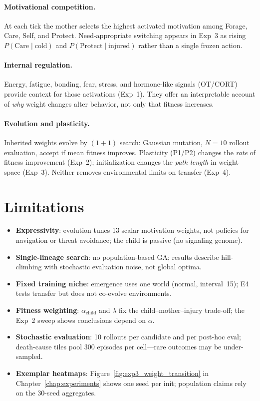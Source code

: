 \paragraph{Motivational competition.}
At each tick the mother selects the highest activated motivation among Forage, Care, Self, and Protect.
Need-appropriate switching appears in Exp~3 as rising $P(\text{Care}\mid\text{cold})$ and $P(\text{Protect}\mid\text{injured})$ rather than a single frozen action.

\paragraph{Internal regulation.}
Energy, fatigue, bonding, fear, stress, and hormone-like signals (OT/CORT) provide context for those activations (Exp~1).
They offer an interpretable account of \emph{why} weight changes alter behavior, not only that fitness increases.

\paragraph{Evolution and plasticity.}
Inherited weights evolve by $(1{+}1)$ search: Gaussian mutation, $N{=}10$ rollout evaluation, accept if mean fitness improves.
Plasticity (P1/P2) changes the \emph{rate} of fitness improvement (Exp~2); initialization changes the \emph{path length} in weight space (Exp~3).
Neither removes environmental limits on transfer (Exp~4).

\section{Limitations}

\begin{itemize}
    \item \textbf{Expressivity}: evolution tunes 13 scalar motivation weights, not policies for navigation or threat avoidance; the child is passive (no signaling genome).
    \item \textbf{Single-lineage search}: no population-based GA; results describe hill-climbing with stochastic evaluation noise, not global optima.
    \item \textbf{Fixed training niche}: emergence uses one world (normal, interval~15); E4 tests transfer but does not co-evolve environments.
    \item \textbf{Fitness weighting}: $\alpha_{\text{child}}$ and $\lambda$ fix the child--mother--injury trade-off; the Exp~2 sweep shows conclusions depend on $\alpha$.
    \item \textbf{Stochastic evaluation}: 10 rollouts per candidate and per post-hoc eval; death-cause tiles pool 300 episodes per cell---rare outcomes may be under-sampled.
    \item \textbf{Exemplar heatmaps}: Figure~\ref{fig:exp3_weight_transition} in Chapter~\ref{chap:experiments} shows one seed per init; population claims rely on the 30-seed aggregates.
\end{itemize}

